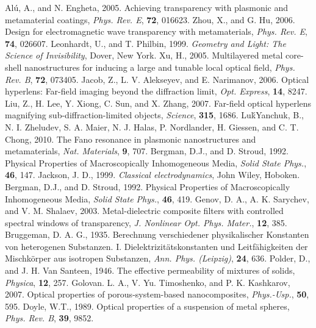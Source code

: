 \begin{thebibliography}{99}
Al{\'u}, A., and N. Engheta, 2005. Achieving transparency with plasmonic and metamaterial coatings, \textit{Phys. Rev. E}, \textbf{72}, 016623.
Zhou, X., and G. Hu, 2006. Design for electromagnetic wave transparency with metamaterials, \textit{Phys. Rev. E}, \textbf{74}, 026607.
Leonhardt, U., and T. Philbin, 1999. \textit{Geometry and Light: The Science of Invisibility}, Dover, New York.
Xu, H., 2005. Multilayered metal core-shell nanostructures for inducing a large and tunable local optical field, \textit{Phys. Rev. B}, \textbf{72}, 073405.
Jacob, Z., L. V. Alekseyev, and E. Narimanov, 2006. Optical hyperlens: Far-field imaging beyond the diffraction limit, \textit{Opt. Express}, \textbf{14}, 8247.
Liu, Z., H. Lee, Y. Xiong, C. Sun, and X. Zhang, 2007. Far-field optical hyperlens magnifying sub-diffraction-limited objects, \textit{Science}, \textbf{315}, 1686.
Lu{\'k}Yanchuk, B., N. I. Zheludev, S. A. Maier, N. J. Halas, P. Nordlander, H. Giessen, and C. T. Chong, 2010. The Fano resonance in plasmonic nanostructures and metamaterials, \textit{Nat. Materials}, \textbf{9}, 707.
Bergman, D.J., and D. Stroud, 1992. Physical Properties of Macroscopically Inhomogeneous Media, \textit{Solid State Phys.}, \textbf{46}, 147.
Jackson, J. D., 1999. \textit{Classical electrodynamics}, John Wiley, Hoboken.
Bergman, D.J., and D. Stroud, 1992. Physical Properties of Macroscopically Inhomogeneous Media, \textit{Solid State Phys.}, \textbf{46}, 419.
Genov, D. A., A. K. Sarychev, and V. M. Shalaev,  2003. Metal-dielectric composite filters with controlled spectral windows of transparency, \textit{J. Nonlinear Opt. Phys. Mater.}, \textbf{12}, 385.
Bruggeman, D. A. G.,  1935. Berechnung verschiedener physikalischer Konstanten von heterogenen Substanzen. I. Dielektrizit\"{a}tskonstanten und Leitf\"{a}higkeiten der Mischk\"{o}rper aus isotropen Substanzen, \textit{Ann. Phys. (\textit{Leipzig})}, \textbf{24}, 636.
Polder, D., and J. H.  Van Santeen, 1946. The effective permeability of mixtures of solids, \textit{Physica}, \textbf{12}, 257.
Golovan. L. A.,  V. Yu. Timoshenko, and P. K. Kashkarov, 2007. Optical properties of porous-system-based nanocomposites, \textit{Phys.-Usp.}, \textbf{50}, 595.
Doyle, W.T., 1989. Optical properties of a suspension of metal spheres, \textit{Phys. Rev. B}, \textbf{39}, 9852.

\end{thebibliography}
